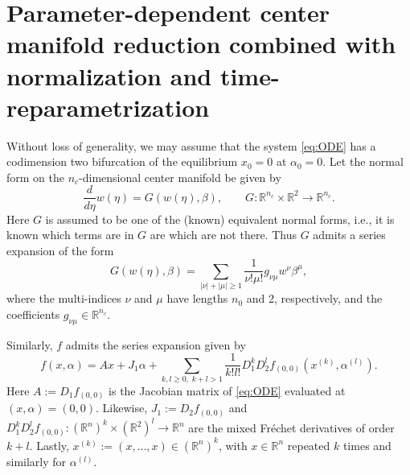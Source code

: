 \section[CMR and normalization]{Parameter-dependent center manifold reduction combined with normalization and time-reparametrization}
\label{sec:Center_manifold_reduction_ODE}

Without loss of generality, we may
assume that the system \cref{eq:ODE} has a codimension two bifurcation of the equilibrium $x_0 = 0$ at $\alpha_0 = 0$. Let the normal form on the
$n_c$-dimensional center manifold be given by
\begin{equation}
    \label{eq:G}
    \frac{d}{d\eta} w(\eta) = G(w(\eta), \beta),
                    \qquad G\colon\mathbb R^{n_c} \times \mathbb
                    R^2 \to \mathbb R^{n_c}.
\end{equation}
Here $G$ is assumed to be one of the (known) equivalent normal forms, i.e.,
it is known which terms are in $G$ are which are not there. Thus $G$ admits a series expansion of the form
\begin{equation}
    \label{eq:G_expansion}
    G(w(\eta), \beta) = \sum_{|\nu|+|\mu| \geq 1} \frac{1}{\nu!\mu!} g_{\nu\mu} w^\nu \beta^\mu,
\end{equation}
where the multi-indices $\nu$ and $\mu$ have lengths $n_0$ and 2,
respectively, and the coefficients $g_{\nu\mu}\in\mathbb R^{n_c}$.

Similarly, $f$ admits the series expansion given by
\begin{equation}
    \label{eq:f_expansion}
    f(x,\alpha) = A x + J_1 \alpha 
    + \sum_{k,l \geq 0, \; k+l>1} \frac{1}{k!l!} D_1^k D_2^l f_{(0,0)}( x^{(k)}, \alpha^{(l)}).
\end{equation}
Here $A:=D_1 f_{(0,0)}$ is the Jacobian matrix of \cref{eq:ODE} evaluated at
$(x,\alpha)=(0,0)$. Likewise, $J_1 := D_2 f_{(0,0)}$ and 
$D_1^k D_2^l f_{(0,0)} \colon \left(\mathbb R^n \right)^k \times \left(\mathbb R^2\right)^l \rightarrow \mathbb R^n$ 
are the mixed Fr\'echet derivatives of order $k+l$. Lastly, $x^{(k)} := (x,\dots,x) \in \left(\mathbb R^n\right)^k$,
with $x\in\mathbb R^n$ repeated $k$ times and similarly for $\alpha^{(l)}$.

